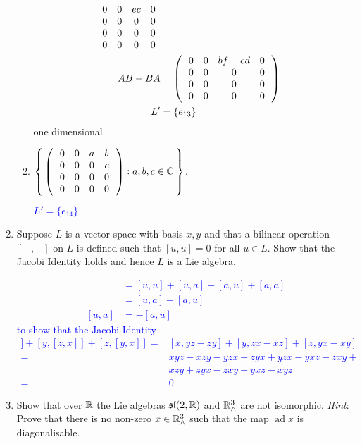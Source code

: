 \documentclass[12pt,a4paper]{report}
\newcommand{\BLUE}[1]{\textcolor{blue}{#1}}
\newcommand{\AD}{\operatorname{ad}}
\begin{document}
\begin{enumerate}[label=3.\arabic*.]
\begin{enumerate}[label=(\roman*)]
{\begin{align*}
{\begin{array}{cccc}
		0&0&ec&0 \\
		0&0&0&0\\
		0&0&0&0\\
		0&0&0&0\\	
	\end{array}
	}\\
	AB-BA &= \left (\, \begin{array}{cccc}
		0&0&bf-ed&0 \\
		0&0&0&0\\
		0&0&0&0\\
		0&0&0&0\\	
	\end{array}
	 \,\right ) \\
	L' &= \{e_{13}\}
\end{align*}	one dimensional
	}
	
	\item $\left \{\, \left (\, \begin{array}{cccc}
		0&0&a&b \\
		0&0&0&c\\
		0&0&0&0\\
		0&0&0&0\\	
	\end{array}
	 \,\right ): a,b,c \in \mathbb{C} \,\right \}$.
	
	\BLUE{$L' = \{e_{14}\}$
	}
\end{enumerate}

\item Suppose $L$ is a vector space with basis $x,y$ and that a bilinear operation $[-,-]$ on $L$ is defined such that $[u,u]=0$ for all $u \in L$.  Show that the Jacobi Identity holds and hence $L$ is a Lie algebra.

\BLUE{\begin{align*}
	[u+a,u+a] &= [u,u]+[u,a]+[a,u]+[a,a] \\
	&=[u,a]+[a,u] \\
	[u,a] &= -[a,u]
\end{align*}to show that the Jacobi Identity
\begin{align*}
	[x, [y,z]] + [y, [z,x]]+[z,[y,x]] = &[x, yz-zy]+[y,zx-xz]+[z,yx-xy] \\
	= &xyz-xzy-yzx+zyx+yzx-yxz-zxy+\\
	&xzy+zyx-zxy+yxz-xyz\\
	= &0
\end{align*}
}

\item Show that over $\mathbb{R}$ the Lie algebras $\mathfrak{sl}(2,\mathbb{R})$ and $\mathbb{R}^3_\wedge$ are not isomorphic.  \textit{Hint}: Prove that there is no non-zero $x\in \mathbb{R}^3_\wedge$ such that the map $\AD x$ is diagonalisable.


\end{enumerate}
\end{document}
